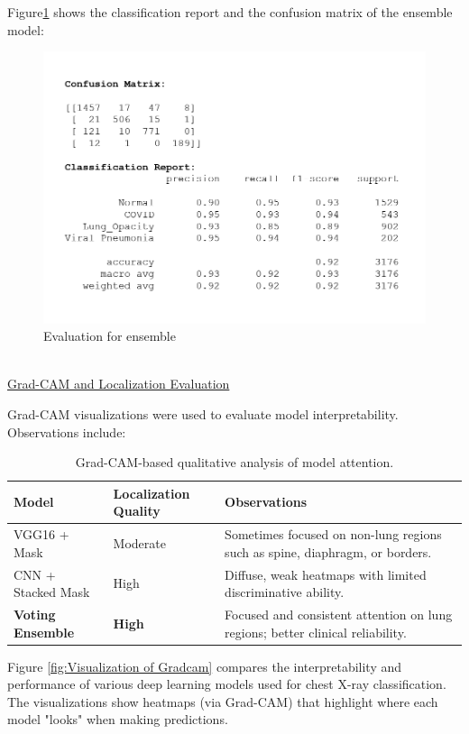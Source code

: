 \documentclass{article}
\begin{document}
Figure\ref{fig: Confusion matrix for ensemble} shows the classification report and the confusion matrix of the ensemble model:
\begin{figure}%
    \centering
    \includegraphics[width=0.5\linewidth]{cm_cr_ensemble.png}
    \caption{Evaluation for ensemble}
    \label{fig: Confusion matrix for ensemble}
\end{figure}\\


\underline{Grad-CAM and Localization Evaluation}

Grad-CAM visualizations were used to evaluate model interpretability. Observations include:

\begin{table}[H]
\centering
\begin{tabular}{|l|l|p{8cm}|}
\hline
\textbf{Model} & \textbf{Localization Quality} & \textbf{Observations} \\
\hline
VGG16 + Mask & Moderate  & Sometimes focused on non-lung regions such as spine, diaphragm, or borders. \\
\hline
CNN + Stacked Mask & High  & Diffuse, weak heatmaps with limited discriminative ability. \\
\hline
\textbf{Voting Ensemble} & \textbf{High} & Focused and consistent attention on lung regions; better clinical reliability. \\
\hline
\end{tabular}
\caption{Grad-CAM-based qualitative analysis of model attention.}
\end{table}



Figure \ref{fig:Visualization of Gradcam} compares the interpretability and performance of various deep learning models used for chest X-ray classification. The visualizations show heatmaps (via Grad-CAM) that highlight where each model "looks" when making predictions.
\end{document}
